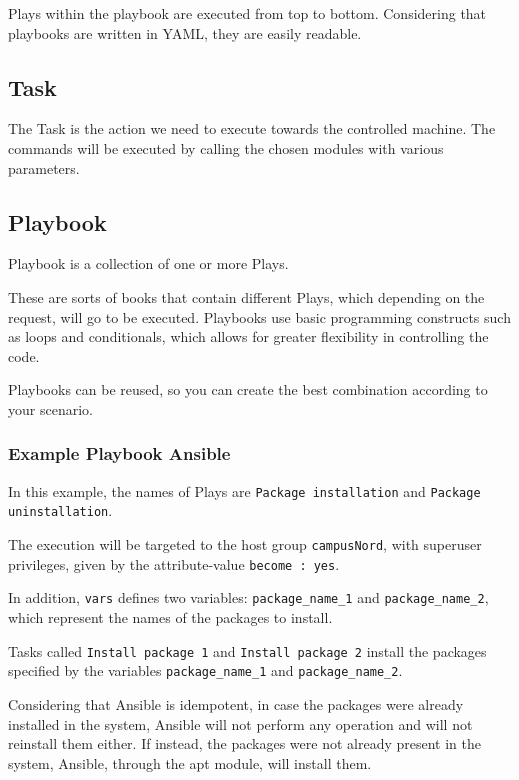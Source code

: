 \documentclass[12pt,a4paper,openright,twoside]{book}
\begin{document}
Plays within the playbook are executed from top to bottom. Considering that playbooks are written in YAML, they are easily readable.

\subsection{Task}
The Task is the action we need to execute towards the controlled machine. The commands will be executed by calling the chosen modules with various parameters.

\subsection{Playbook}
Playbook is a collection of one or more Plays.


These are sorts of books that contain different Plays, which depending on the request, will go to be executed. Playbooks use basic programming constructs such as loops and conditionals, which allows for greater flexibility in controlling the code.


Playbooks can be reused, so you can create the best combination according to your scenario.

\subsubsection{Example Playbook Ansible}



In this example, the names of Plays are \texttt{Package installation} and \texttt{Package uninstallation}.


The execution will be targeted to the host group \texttt{campusNord}, with superuser privileges, given by the attribute-value \texttt{become : yes}.


In addition, \texttt{vars} defines two variables: \texttt{package\_name\_1} and \texttt{package\_name\_2}, which represent the names of the packages to install.


Tasks called \texttt{Install package 1} and \texttt{Install package 2} install the packages specified by the variables \texttt{package\_name\_1} and \texttt{package\_name\_2}.


Considering that Ansible is idempotent, in case the packages were already installed in the system, Ansible will not perform any operation and will not reinstall them either. If instead, the packages were not already present in the system, Ansible, through the apt module, will install them.
\end{document}
